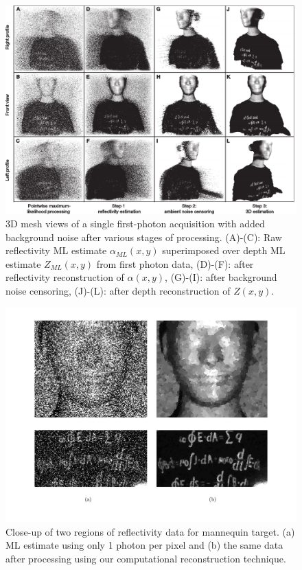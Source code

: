 \begin{figure}[h!]
\centering
\includegraphics[width=\textwidth]{figure-first-mannequin.pdf}
\caption{3D mesh views of a single first-photon acquisition with added background noise after various stages of processing. (A)-(C): Raw reflectivity ML estimate $\alpha_{ML}(x,y)$ superimposed over depth ML estimate $Z_{ML}(x,y)$ from first photon data, (D)-(F): after reflectivity reconstruction of $\alpha(x,y)$, (G)-(I): after background noise censoring, (J)-(L): after depth reconstruction of $Z(x,y)$.}
\label{figure:first-mannequin}
\end{figure}


\begin{figure}[h!]
\centerline{\includegraphics[width=\textwidth]{figure-first-mannequin-zoom.pdf}}
\caption{Close-up of two regions of reflectivity data for mannequin target. (a) ML estimate using only 1 photon per pixel and (b) the same data after processing using our computational reconstruction technique.}
\label{figure:first-mannequin-zoom}
\end{figure}

